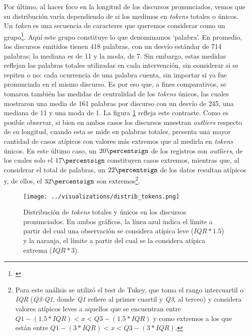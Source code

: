 Por último, al hacer foco en la longitud de los discursos pronunciados, vemos que su
distribución varía dependiendo de si los medimos en \textit{tokens} totales o únicos.
Un \textit{token} es una secuencia de caracteres que queremos considerar como un
grupo\footnote{\citet*{bird2009natural}}. Aquí este grupo constituye lo que denominamos
`palabra'. En promedio, los discursos emitidos tienen 418 palabras, con un desvío
estándar de 714 palabras; la mediana es de 11 y la moda, de 7. Sin embargo, estas medidas
reflejan las palabras totales utilizadas en cada intervención, sin considerar si se repiten
o no: cada ocurrencia de una palabra cuenta, sin importar si ya fue pronunciada en el mismo
discurso. Es por eso que, a fines comparativos, se tomaron también las medidas de centralidad
de los \textit{tokens} únicos, las cuales mostraron una media de 161 palabras por discurso
con un desvío de 245, una mediana de 11 y una moda de 1. La figura \ref{fig-distrib-tokens}
refleja este contraste. Como es posible observar, si bien en ambos casos los discursos
muestran \textit{outliers} respecto de su longitud, cuando esta se mide en palabras
totales, presenta una mayor cantidad de casos atípicos con valores más extremos que
al medirla en \textit{tokens} únicos. En este último caso, un
$20\percentsign$ de los registros son \textit{outliers}, de los cuales solo el
$17\percentsign$ constituyen casos extremos, mientras que, al considerar
el total de palabras, un $22\percentsign$ de los datos resultan atípicos y,
de ellos, el $32\percentsign$ son extremos\footnote{Para este análisis se utilizó el
test de Tukey, que toma el rango intercuartil o \textit{IQR} (\textit{Q3-Q1}, donde
\textit{Q1} refiere al primer cuartil y \textit{Q3}, al terceo) y considera
valores atípicos leves a aquellos que se encuentran entre
$Q1 - (1.5 * IQR) < x < Q3 - (1.5 * IQR)$ y como extremos a los que están entre
$Q1 - (3 * IQR) < x < Q3 - (3 * IQR)$.}.

\begin{figure}[h!]%
    \centering%
    \texttt{[image: ../visualizations/distrib\_tokens.png]}%
    \caption{Distribución de \textit{tokens} totales y únicos en los discursos pronunciados. En ambos gráficos,
    la línea azul indica el límite a partir del cual una observación se considera atípica leve
    ($IQR*1.5$) y la naranja, el límite a partir del cual se la considera atípica extrema ($IQR*3$).}%
    \label{fig-distrib-tokens}%
\end{figure}%


